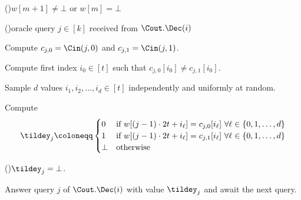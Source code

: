 	\begin{algorithm}[tp]
		\DontPrintSemicolon
		\caption{Decoding algorithm $\Dec$.}\label{alg:decoder}
		
		\lIf(\label{line:len-check}){$w[m+1] \neq \bot$ or $w[m] = \bot$}{\Return{$\tildex = \bot$}}
		
		\ForEach(){oracle query $j \in [k]$ received from $\Cout.\Dec(i)$}{
			Compute $c_{j,0} = \Cin(j, 0)$ and $c_{j,1} = \Cin(j,1)$.
			
			Compute first index $i_0 \in [t]$ such that $c_{j,0}[i_0] \neq c_{j,1}[i_0]$.\label{line:perfect-completeness}
			
			Sample $d$ values $i_1, i_2, \dotsc, i_d \in [t]$ independently and uniformly at random.\label{line:index-sampling}
			
			Compute \label{line:tildey}
			\begin{align*}
				\tildey_j \coloneqq \begin{cases}
					0 & \text{if } w[(j-1)\cdot 2t + i_\ell] = c_{j,0}[i_\ell]~ \forall \ell \in \{0,1,\dotsc, d\}\\
					1 & \text{if } w[(j-1)\cdot 2t + i_\ell] = c_{j,1}[i_\ell]~ \forall \ell \in \{0,1,\dotsc, d\}\\
					\bot & \text{otherwise}
				\end{cases}
			\end{align*}
		
			\lIf(\label{line:bot-check}){$\tildey_j = \bot$}{\Return{$\tildex = \bot$}.} %
		
			Answer query $j$ of $\Cout.\Dec(i)$ with value $\tildey_j$ and await the next query.
		}
	
	\end{algorithm}

